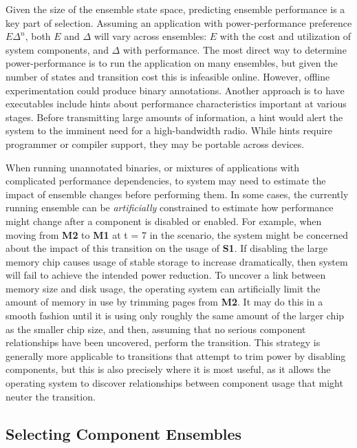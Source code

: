 Given the size of the ensemble state space, predicting ensemble performance
is a key part of selection. Assuming an application with power-performance
preference $E\Delta^n$, both $E$ and $\Delta$ will vary across ensembles: $E$
with the cost and utilization of system components, and $\Delta$ with
performance. The most direct way to determine power-performance is to run the
application on many ensembles, but given the number of states and transition
cost this is infeasible online. However, offline experimentation could
produce binary annotations. Another approach is to have executables include
hints about performance characteristics important at various stages. Before
transmitting large amounts of information, a hint would alert the system to
the imminent need for a high-bandwidth radio. While hints require programmer
or compiler support, they may be portable across devices.

When running unannotated binaries, or mixtures of applications with
complicated performance dependencies, to system may need to estimate the
impact of ensemble changes before performing them. In some cases, the
currently running ensemble can be \textit{artificially} constrained to estimate how
performance might change after a component is disabled or enabled. For
example, when moving from \textbf{M2} to \textbf{M1} at t = 7 in the
scenario, the system might be concerned about the impact of this transition
on the usage of \textbf{S1}. If disabling the large memory chip causes usage
of stable storage to increase dramatically, then system will fail to achieve
the intended power reduction. To uncover a link between memory size and disk
usage, the operating system can artificially limit the amount of memory in
use by trimming pages from \textbf{M2}. It may do this in a smooth fashion
until it is using only roughly the same amount of the larger chip as the
smaller chip size, and then, assuming that no serious component relationships
have been uncovered, perform the transition. This strategy is generally more
applicable to transitions that attempt to trim power by disabling components,
but this is also precisely where it is most useful, as it allows the
operating system to discover relationships between component usage that might
neuter the transition.

\subsection{Selecting Component Ensembles}
\label{subsec-select}

